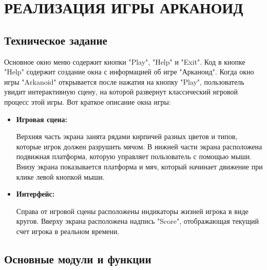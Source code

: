 \chapter{\label{ch:ch02}РЕАЛИЗАЦИЯ ИГРЫ АРКАНОИД}

\section{\label{sec:ch02/sec01}Техническое задание}
Основное окно меню содержит кнопки "Play", "Help" и "Exit". Код в кнопке "Help" содержит создание окна с информацией об игре "Арканоид". Когда окно игры "Arkanoid" открывается после нажатия на кнопку "Play", пользователь увидит интерактивную сцену, на которой развернут классический игровой процесс этой игры. Вот краткое описание окна игры:
\begin{itemize}
    \item \textbf{Игровая сцена:}
    
        Верхняя часть экрана занята рядами кирпичей разных цветов и типов, которые игрок должен разрушить мячом. В нижней части экрана расположена подвижная платформа, которую управляет пользователь с помощью мыши. Внизу экрана показывается платформа и мяч, который начинает движение при клике левой кнопкой мыши.

    \item \textbf{Интерфейс:}
    
        Справа от игровой сцены расположены индикаторы жизней игрока в виде кругов. Вверху экрана расположена надпись "Score", отображающая текущий счет игрока в реальном времени. 
\end{itemize}
\section{\label{sec:ch02/sec02}Основные модули и функции}

